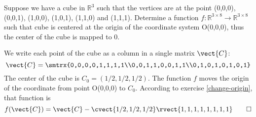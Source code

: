 \begin{exercise}
Suppose we have a cube in $\mathbb{R}^3$ such that the vertices are at the point (0,0,0), (0,0,1), (1,0,0), (1,0,1), (1,1,0) and (1,1,1). Determine a function $f:\mathbb{R}^{3\times8}\rightarrow\mathbb{R}^{3\times8}$ such that cube is centered at the origin of the coordinate system O(0,0,0), thus the center of the cube is mapped to 0.
\end{exercise}

\begin{solution}
We write each point of the cube as a column in a single matrix $\vect{C}$:
\[ \vect{C}=\smtrx{0,0,0,0,1,1,1,1\\0,0,1,1,0,0,1,1\\0,1,0,1,0,1,0,1} \]
The center of the cube is $C_0=(1/2,1/2,1/2)$. The function $f$ moves the origin of the coordinate from point O(0,0,0) to $C_0$. According to exercise \ref{change-origin}, that function is 
\[ f(\vect{C})=\vect{C} - \cvect{1/2,1/2,1/2}\rvect{1,1,1,1,1,1,1,1}\qedhere \]
\end{solution}
